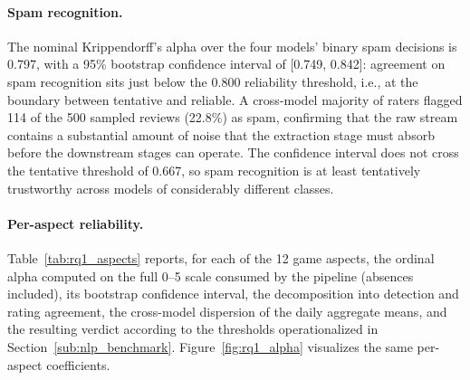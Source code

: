 \paragraph{Spam recognition.} The nominal Krippendorff's alpha over the four models' binary spam decisions is 0.797, with a 95\% bootstrap confidence interval of [0.749, 0.842]: agreement on spam recognition sits just below the 0.800 reliability threshold, i.e., at the boundary between tentative and reliable. A cross-model majority of raters flagged 114 of the 500 sampled reviews (22.8\%) as spam, confirming that the raw stream contains a substantial amount of noise that the extraction stage must absorb before the downstream stages can operate. The confidence interval does not cross the tentative threshold of 0.667, so spam recognition is at least tentatively trustworthy across models of considerably different classes.

\paragraph{Per-aspect reliability.} Table~\ref{tab:rq1_aspects} reports, for each of the 12 game aspects, the ordinal alpha computed on the full 0--5 scale consumed by the pipeline (absences included), its bootstrap confidence interval, the decomposition into detection and rating agreement, the cross-model dispersion of the daily aggregate means, and the resulting verdict according to the thresholds operationalized in Section~\ref{sub:nlp_benchmark}. Figure~\ref{fig:rq1_alpha} visualizes the same per-aspect coefficients.

